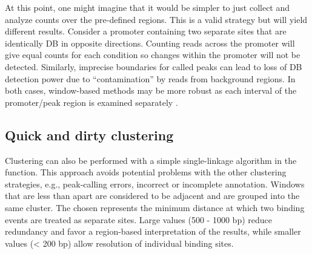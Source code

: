 \documentclass{report}\usepackage[]{graphicx}\usepackage[usenames,dvipsnames]{color}
\newcommand{\hlnum}[1]{\textcolor[rgb]{0.816,0.125,0.439}{#1}}%
\newcommand{\hlopt}[1]{\textcolor[rgb]{0,0,0}{#1}}%
\newcommand{\hlstd}[1]{\textcolor[rgb]{0.251,0.251,0.251}{#1}}%
\newcommand{\hlkwb}[1]{\textcolor[rgb]{0,0,0}{#1}}%
\newcommand{\hlkwc}[1]{\textcolor[rgb]{0.251,0.251,0.251}{#1}}%
\newcommand{\hlkwd}[1]{\textcolor[rgb]{0.878,0.439,0.125}{#1}}%
\newenvironment{knitrout}{}{} %
\begin{document}
At this point, one might imagine that it would be simpler to just collect and analyze counts over the pre-defined regions. 
This is a valid strategy but will yield different results. 
Consider a promoter containing two separate sites that are identically DB in opposite directions. 
Counting reads across the promoter will give equal counts for each condition so changes within the promoter will not be detected. 
Similarly, imprecise boundaries for called peaks can lead to loss of DB detection power due to ``contamination'' by reads from background regions. 
In both cases, window-based methods may be more robust as each interval of the promoter/peak region is examined separately \cite{lun2014}.

\subsection{Quick and dirty clustering}
\label{sec:cluster}
Clustering can also be performed with a simple single-linkage algorithm in the  function.
This approach avoids potential problems with the other clustering strategies, e.g., peak-calling errors, incorrect or incomplete annotation. 
Windows that are less than  apart are considered to be adjacent and are grouped into the same cluster.
The chosen  represents the minimum distance at which two binding events are treated as separate sites.
Large values (500 - 1000 bp) reduce redundancy and favor a region-based interpretation of the results, while smaller values (\textless{} 200 bp) allow resolution of individual binding sites.

\begin{knitrout}
\color{fgcolor}
\end{knitrout}
\end{document}
